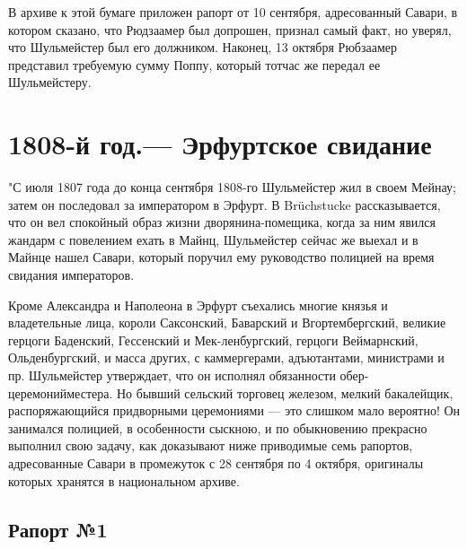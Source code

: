\documentclass[
  oneside,
  12pt,
  titlepage]{book}
\begin{document}
В архиве к этой бумаге приложен рапорт от 10 сентября, адресованный Савари, в котором сказано, что Рюдзаамер был допрошен, признал самый факт, но уверял, что Шульмейстер был его должником. Наконец, 13 октября Рюбзаамер представил требуемую сумму Поппу, который тотчас же передал ее Шульмейстеру.

\hypertarget{ux439-ux433ux43eux434.-ux44dux440ux444ux443ux440ux442ux441ux43aux43eux435-ux441ux432ux438ux434ux430ux43dux438ux435}{%
\chapter{1808-й год.--- Эрфуртское свидание}\label{ux439-ux433ux43eux434.-ux44dux440ux444ux443ux440ux442ux441ux43aux43eux435-ux441ux432ux438ux434ux430ux43dux438ux435}}

"С июля 1807 года до конца сентября 1808-го Шульмейстер жил в своем Мейнау; затем он последовал за императором в Эрфурт. В Brüchstucke рассказывается, что он вел спокойный образ жизни дворянина-помещика, когда за ним явился жандарм с повелением ехать в Майнц, Шульмейстер сейчас же выехал и в Майнце нашел Савари, который поручил ему руководство полицией на время свидания императоров.

Кроме Александра и Наполеона в Эрфурт съехались многие князья и владетельные лица, короли Саксонский, Баварский и Вгортембергский, великие герцоги Баденский, Гессенский и Мек-ленбургский, герцоги Веймарнский, Ольденбургский, и масса других, с каммергерами, адъютантами, министрами и пр. Шульмейстер утверждает, что он исполнял обязанности обер-церемонийместера. Но бывший сельский торговец железом, мелкий бакалейщик, распоряжающийся придворными церемониями --- это слишком мало вероятно! Он занимался полицией, в особенности сыскною, и по обыкновению прекрасно выполнил свою задачу, как доказывают ниже приводимые семь рапортов, адресованные Савари в промежуток с 28 сентября по 4 октября, оригиналы которых хранятся в национальном архиве.

\hypertarget{ux440ux430ux43fux43eux440ux442-1}{%
\section{Рапорт №1}\label{ux440ux430ux43fux43eux440ux442-1}}
\end{document}
